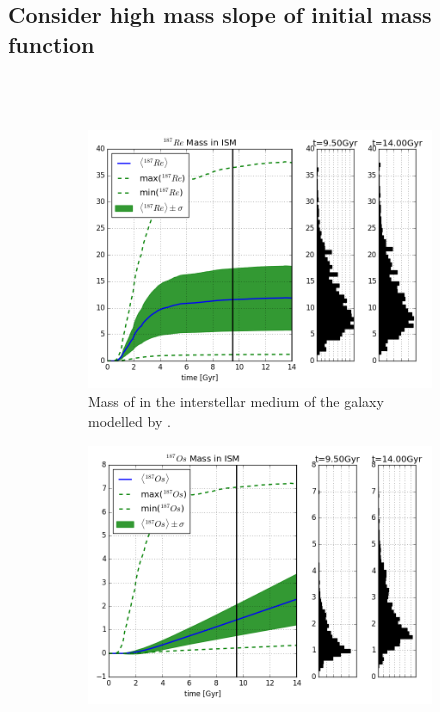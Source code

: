 \subsection{Consider high mass slope of initial mass function}
 \\
 \\
\iffalse
\begin{figure}
  \centering
  \begin{subfigure}{\subfigwidth}
    \includegraphics[width=\linewidth]{results/MCExperiment_revised_2_imfslope/combined_plot_Re-187_decayed.png}
    \caption{\label{fig:MCExperiment-imfslope-re187}
      Mass of  in the interstellar medium of the galaxy modelled by \omegamodel.
    }
  \end{subfigure}
  \begin{subfigure}{\subfigwidth}
    \includegraphics[width=\linewidth]{results/MCExperiment_revised_2_imfslope/combined_plot_Os-187_decayed.png}

\end{subfigure}
\end{figure}
